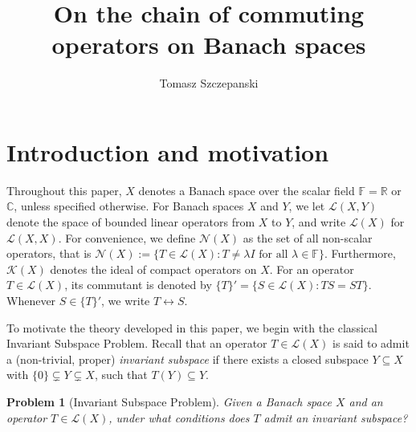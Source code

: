 \documentclass[a4paper,12pt]{article}
\date{}
\title{On the chain of commuting operators on Banach spaces}
\author{Tomasz Szczepanski}
\newtheorem{problem}[thm]{Problem}
\theoremstyle{definition}
\numberwithin{equation}{section}
\numberwithin{thm}{section}
\newcommand{\R}{\mathbb{R}}
\newcommand{\C}{\mathbb{C}}
\begin{document}
\maketitle


\section{Introduction and motivation}
Throughout this paper, $X$ denotes a Banach space over the scalar field $\mathbb{F} = \R$ or $\C$, unless specified otherwise. For Banach spaces $X$ and $Y$, we let $\mathcal{L}(X,Y)$ denote the space of bounded linear operators from $X$ to $Y$, and write $\mathcal{L}(X)$ for $\mathcal{L}(X,X)$. For convenience, we define $\mathcal{N}(X)$ as the set of all non-scalar operators, that is $\mathcal{N}(X):=\{T\in \mathcal{L}(X): T\neq \lambda I \text{ for all }\lambda \in\mathbb{F}\}$. Furthermore, $\mathcal{K}(X)$ denotes the ideal of compact operators on $X$. For an operator $T\in \mathcal{L}(X)$, its commutant is denoted by $\{T\}' = \{S\in \mathcal{L}(X): TS=ST\}$. Whenever $S\in \{T\}'$, we write $T\leftrightarrow S$. 

To motivate the theory developed in this paper, we begin with the classical Invariant Subspace Problem. Recall that an operator $T\in \mathcal{L}(X)$ is said to admit a (non-trivial, proper) \textit{invariant subspace} if there exists a closed subspace $Y \subseteq X$ with $\{0\}\subsetneq Y\subsetneq X$, such that $T(Y)\subseteq Y$. 
\begin{problem}[Invariant Subspace Problem]
Given a Banach space $X$ and an operator $T\in \mathcal{L}(X)$, under what conditions does $T$ admit an invariant subspace?
\end{problem}
\end{document}
